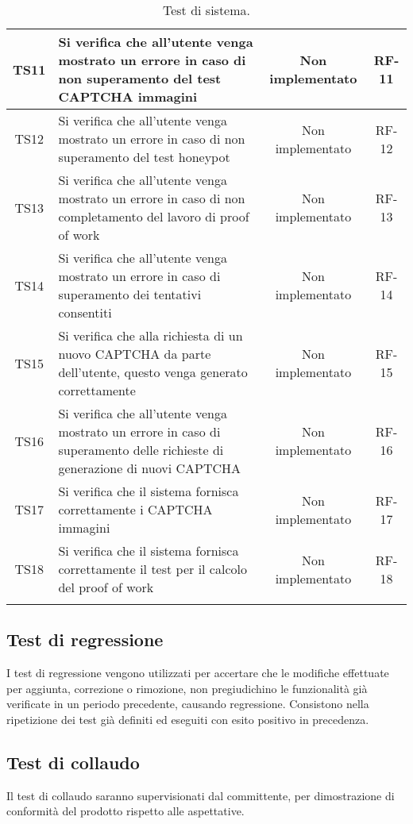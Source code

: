 \begin{center}
\begin{xltabular}{\textwidth}{|c|X|c|c|}
		\hline
		TS11 & Si verifica che all’utente venga mostrato un errore in caso di non superamento del test CAPTCHA immagini & Non implementato & RF-11\\
		\hline
		TS12 & Si verifica che all’utente venga mostrato un errore in caso di non superamento del test honeypot & Non implementato & RF-12\\
		\hline
		TS13 & Si verifica che all’utente venga mostrato un errore in caso di non completamento del lavoro di proof of work & Non implementato & RF-13\\
		\hline
		TS14 & Si verifica che all’utente venga mostrato un errore in caso di superamento dei tentativi consentiti & Non implementato & RF-14\\
		\hline
		TS15 & Si verifica che alla richiesta di un nuovo CAPTCHA da parte dell'utente, questo venga generato correttamente & Non implementato & RF-15\\
		\hline
		TS16 & Si verifica che all’utente venga mostrato un errore in caso di superamento delle richieste di generazione di nuovi CAPTCHA & Non implementato & RF-16\\
		\hline
		TS17 & Si verifica che il sistema fornisca correttamente i CAPTCHA immagini & Non implementato & RF-17\\
		\hline
		TS18 & Si verifica che il sistema fornisca correttamente il test per il calcolo del proof of work & Non implementato & RF-18\\
		\hline
		\caption{Test di sistema.}
	\end{xltabular}
\end{center}


\subsection{Test di regressione}
I test di regressione vengono utilizzati per accertare che le modifiche effettuate per aggiunta, correzione o rimozione, non pregiudichino le funzionalità già verificate in un periodo precedente, causando regressione. Consistono nella ripetizione dei test già definiti ed eseguiti con esito positivo in precedenza.

\subsection{Test di collaudo}
Il test di collaudo saranno supervisionati dal committente, per dimostrazione di conformità del prodotto rispetto alle aspettative.
